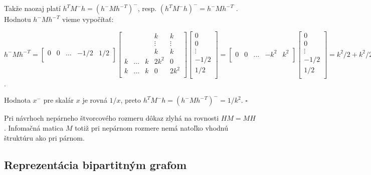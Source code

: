 \begin{dokaz}
Takže naozaj platí $h^T M^- h = (h^- M {h^-}^T)^-$, resp. $(h^T M^- h)^- = h^- M {h^-}^T$ . Hodnotu $h^- M {h^-}^T$ vieme vypočítať:

\begin{center}
$
h^- M {h^-}^T = 
\begin{bmatrix}
0 & 0 & \ldots & -1/2 & 1/2 \\
\end{bmatrix}
\begin{bmatrix}
&&& k & k \\
&&& \vdots & \vdots \\
&&& k & k \\
k & \ldots & k & 2k^2 & 0 \\
k & \ldots & k & 0 & 2k^2 \\
\end{bmatrix}
\begin{bmatrix}
0 \\
0 \\
\vdots \\
-1/2 \\
1/2 \\
\end{bmatrix}
=
\begin{bmatrix}
0 & 0 & \ldots & -k^2 & k^2 \\
\end{bmatrix}
\begin{bmatrix}
0 \\
0 \\
\vdots \\
-1/2 \\
1/2 \\
\end{bmatrix}
= k^2/2 + k^2/2 = k^2
$.
\end{center}

Hodnota $x^-$ pre skalár $x$ je rovná $1/x$, preto $h^T M^- h = (h^- M {h^-}^T)^- = 1/k^2$. $\square$

\end{dokaz}

\begin{com}
Pri návrhoch nepárneho štvorcového rozmeru dôkaz zlyhá na rovnosti $HM = MH$.
Infomačná matica $M$ totiž pri nepárnom rozmere nemá natoľko vhodnú štruktúru ako pri párnom.
\end{com}

\subsection{Reprezentácia bipartitným grafom}

